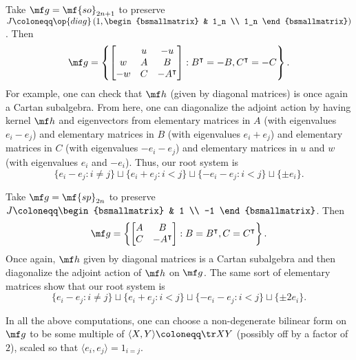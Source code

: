 \documentclass[../notes.tex]{subfiles}
\begin{document}
\begin{example}[type $B_n$]
	Take $\mf g=\mf{so}_{2n+1}$ to preserve $J\coloneqq\op{diag}\left(1,\begin{bsmallmatrix}
		& 1_n \\ 1_n
	\end{bsmallmatrix}\right)$. Then
	\[\mf g=\left\{\begin{bmatrix}
		& u & -u \\
		w & A & B \\
		-w & C & -A^\intercal
	\end{bmatrix}:B^\intercal=-B,C^\intercal=-C\right\}.\]
	For example, one can check that $\mf h$ (given by diagonal matrices) is once again a Cartan subalgebra. From here, one can diagonalize the adjoint action by having kernel $\mf h$ and eigenvectors from elementary matrices in $A$ (with eigenvalues $e_i-e_j$) and elementary matrices in $B$ (with eigenvalues $e_i+e_j$) and elementary matrices in $C$ (with eigenvalues $-e_i-e_j$) and elementary matrices in $u$ and $w$ (with eigenvalues $e_i$ and $-e_i$). Thus, our root system is
	\[\{e_i-e_j:i\ne j\}\sqcup\{e_i+e_j:i<j\}\sqcup\{-e_i-e_j:i<j\}\sqcup\{\pm e_i\}.\]
\end{example}
\begin{example}[type $C_n$]
	Take $\mf g=\mf{sp}_{2n}$ to preserve $J\coloneqq\begin{bsmallmatrix}
		& 1 \\ -1
	\end{bsmallmatrix}$. Then
	\[\mf g=\left\{\begin{bmatrix}
		A & B \\ C & -A^\intercal
	\end{bmatrix}:B=B^\intercal,C=C^\intercal\right\}.\]
	Once again, $\mf h$ given by diagonal matrices is a Cartan subalgebra and then diagonalize the adjoint action of $\mf h$ on $\mf g$. The same sort of elementary matrices show that our root system is
	\[\{e_i-e_j:i\ne j\}\sqcup\{e_i+e_j:i<j\}\sqcup\{-e_i-e_j:i<j\}\sqcup\{\pm2e_i\}.\]
\end{example}
\begin{remark}
	In all the above computations, one can choose a non-degenerate bilinear form on $\mf g$ to be some multiple of $\langle X,Y\rangle\coloneqq\tr XY$ (possibly off by a factor of $2$), scaled so that $\langle e_i,e_j\rangle=1_{i=j}$.
\end{remark}
\end{document}
